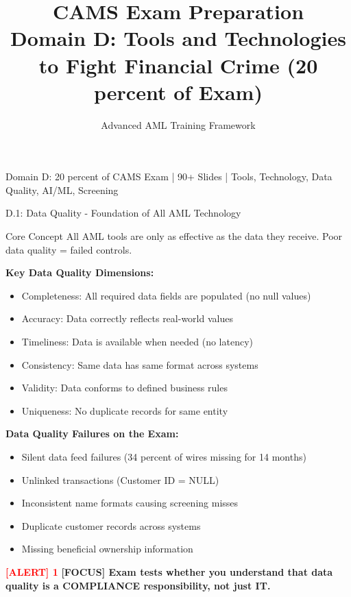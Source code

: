 \documentclass[11pt,a4paper]{beamer}
\title[CAMS Domain D]{CAMS Exam Preparation\\Domain D: Tools and Technologies\\to Fight Financial Crime (20 percent of Exam)}
\author{Advanced AML Training Framework}
\date{}
\renewcommand{\tiny}{\fontsize{5pt}{6pt}\selectfont}
\newcommand{\redflag}[1]{\textcolor{red}{\textbf{[ALERT] 1}}}
\newcommand{\examfocus}[1]{\textcolor{orange!80!black}{\textbf{[FOCUS] #1}}}
\begin{document}
\begin{frame}
	\titlepage
	\centering
	\tiny Domain D: 20 percent of CAMS Exam | 90+ Slides | Tools, Technology, Data Quality, AI/ML, Screening
\end{frame}


\begin{frame}{D.1: Data Quality - Foundation of All AML Technology}
	\begin{block}{Core Concept}
		All AML tools are only as effective as the data they receive. Poor data quality = failed controls.
	\end{block}
	\textbf{Key Data Quality Dimensions:}
	\begin{itemize}
		\item Completeness: All required data fields are populated (no null values)
		\item Accuracy: Data correctly reflects real-world values
		\item Timeliness: Data is available when needed (no latency)
		\item Consistency: Same data has same format across systems
		\item Validity: Data conforms to defined business rules
		\item Uniqueness: No duplicate records for same entity
	\end{itemize}
	\textbf{Data Quality Failures on the Exam:}
	\begin{itemize}
		\item Silent data feed failures (34 percent of wires missing for 14 months)
		\item Unlinked transactions (Customer ID = NULL)
		\item Inconsistent name formats causing screening misses
		\item Duplicate customer records across systems
		\item Missing beneficial ownership information
	\end{itemize}
	\redflag{Most common exam scenario: Missing data with no error messages - undetected gap for months or years.}
	\examfocus{Exam tests whether you understand that data quality is a COMPLIANCE responsibility, not just IT.}
\end{frame}
\end{document}
